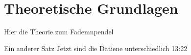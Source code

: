 \section{Theoretische Grundlagen}



Hier die Theorie zum Fademnpendel

Ein anderer Satz
 Jetzt sind die Datiene unterschiedlich 13:22
